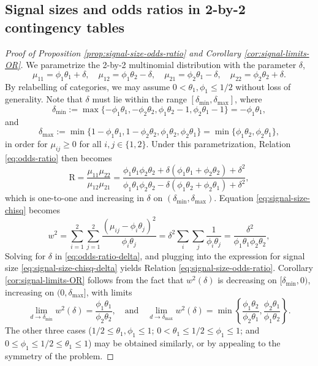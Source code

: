 \subsection{Signal sizes and odds ratios in 2-by-2 contingency tables}
\label{subsec:proof-signal-size-odds-ratio}

\begin{proof}[Proof of Proposition \ref{prop:signal-size-odds-ratio} and Corollary \ref{cor:signal-limits-OR}]
We parametrize the 2-by-2 multinomial distribution with the parameter $\delta$, 
\begin{equation} \label{eq:reparametrize-2-by-2-table-1}
    \mu_{11} = \phi_1\theta_1+\delta,\quad 
    \mu_{12} = \phi_1\theta_2-\delta,\quad 
    \mu_{21} = \phi_2\theta_1-\delta,\quad 
    \mu_{22} = \phi_2\theta_2+\delta.
\end{equation}
By relabelling of categories, we may assume $0<\theta_1,\phi_1\le1/2$ without loss of generality.
Note that $\delta$ must lie within the range $[\delta_\mathrm{min}, \delta_\mathrm{max}]$, where
$$
\delta_\mathrm{min} := \max\{-\phi_1\theta_1, -\phi_2\theta_2, \phi_1\theta_2-1, \phi_2\theta_1-1\} 
= -\phi_1\theta_1,
$$
and
$$
\delta_\mathrm{max} := \min\{1-\phi_1\theta_1, 1-\phi_2\theta_2, \phi_1\theta_2, \phi_2\theta_1\}
= \min\{\phi_1\theta_2, \phi_2\theta_1\},
$$
in order for $\mu_{ij}\ge0$ for all $i,j\in \{1,2\}$.
Under this parametrization, Relation \eqref{eq:odds-ratio} then becomes
\begin{equation} \label{eq:odds-ratio-delta}
    \text{R} = \frac{\mu_{11}\mu_{22}}{\mu_{12}\mu_{21}}
    = \frac{\phi_1\theta_1\phi_2\theta_2 + \delta(\phi_1\theta_1+\phi_2\theta_2)+\delta^2}{\phi_1\theta_1\phi_2\theta_2 - \delta(\phi_1\theta_2+\phi_2\theta_1)+\delta^2},
\end{equation}
which is one-to-one and increasing in $\delta$ on $(\delta_\mathrm{min}, \delta_\mathrm{max})$.
Equation \eqref{eq:signal-size-chisq} becomes
\begin{equation} \label{eq:signal-size-chisq-delta}
w^2 = \sum_{i=1}^2 \sum_{j=1}^2 \frac{(\mu_{ij} - \phi_i\theta_j)^2}{\phi_i\theta_j}
= \delta^2\sum_i\sum_j \frac{1}{\phi_i\theta_j}
= \frac{\delta^2}{\phi_1\theta_1\phi_2\theta_2},
\end{equation}
Solving for $\delta$ in \eqref{eq:odds-ratio-delta}, and plugging into the expression for signal size \eqref{eq:signal-size-chisq-delta} yields Relation \eqref{eq:signal-size-odds-ratio}.
Corollary \ref{cor:signal-limits-OR} follows from the fact that $w^2(\delta)$ is decreasing on $[\delta_\mathrm{min},0)$, increasing on $(0,\delta_\mathrm{max}]$, with limits
$$
\lim_{d\to \delta_\mathrm{min}} w^2(\delta) = \frac{\phi_1\theta_1}{\phi_2\theta_2},
\quad
\text{and}
\quad
\lim_{d\to \delta_\mathrm{max}} w^2(\delta) = \min\left\{\frac{\phi_1\theta_2}{\phi_2\theta_1}, \frac{\phi_2\theta_1}{\phi_1\theta_2}\right\}.
$$
The other three cases ($1/2\le\theta_1,\phi_1\le1$; $0<\theta_1\le1/2\le\phi_1\le1$; and $0\le\phi_1\le1/2\le\theta_1\le1$) may be obtained similarly, or by appealing to the symmetry of the problem.
\end{proof}

